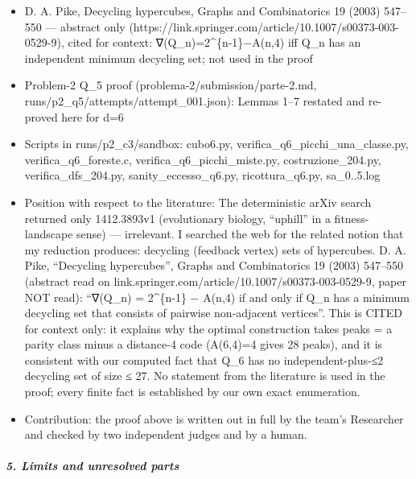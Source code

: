 \documentclass[11pt,a4paper]{article}
\providecommand{\tightlist}{\setlength{\itemsep}{0pt}\setlength{\parskip}{0pt}}
\begin{document}
\begin{itemize}
\tightlist
\item
  D. A. Pike, Decycling hypercubes, Graphs and Combinatorics 19 (2003)
  547--550 --- abstract only
  (https://link.springer.com/article/10.1007/s00373-003-0529-9), cited
  for context: ∇(Q\_n)=2\^{}\{n-1\}−A(n,4) iff Q\_n has an independent
  minimum decycling set; not used in the proof
\item
  Problem-2 Q\_5 proof (problema-2/submission/parte-2.md,
  runs/p2\_q5/attempts/attempt\_001.json): Lemmas 1--7 restated and
  re-proved here for d=6
\item
  Scripts in runs/p2\_c3/sandbox: cubo6.py,
  verifica\_q6\_picchi\_una\_classe.py, verifica\_q6\_foreste.c,
  verifica\_q6\_picchi\_miste.py, costruzione\_204.py,
  verifica\_dfs\_204.py, sanity\_eccesso\_q6.py, ricottura\_q6.py,
  sa\_0..5.log
\item
  Position with respect to the literature: The deterministic arXiv
  search returned only 1412.3893v1 (evolutionary biology, ``uphill'' in
  a fitness-landscape sense) --- irrelevant. I searched the web for the
  related notion that my reduction produces: decycling (feedback vertex)
  sets of hypercubes. D. A. Pike, ``Decycling hypercubes'', Graphs and
  Combinatorics 19 (2003) 547--550 (abstract read on
  link.springer.com/article/10.1007/s00373-003-0529-9, paper NOT read):
  ``∇(Q\_n) = 2\^{}\{n-1\} − A(n,4) if and only if Q\_n has a minimum
  decycling set that consists of pairwise non-adjacent vertices''. This
  is CITED for context only: it explains why the optimal construction
  takes peaks = a parity class minus a distance-4 code (A(6,4)=4 gives
  28 peaks), and it is consistent with our computed fact that Q\_6 has
  no independent-plus-≤2 decycling set of size ≤ 27. No statement from
  the literature is used in the proof; every finite fact is established
  by our own exact enumeration.
\item
  Contribution: the proof above is written out in full by the team's
  Researcher and checked by two independent judges and by a human.
\end{itemize}

\subparagraph{5. Limits and unresolved
parts}\label{limits-and-unresolved-parts}
\end{document}
